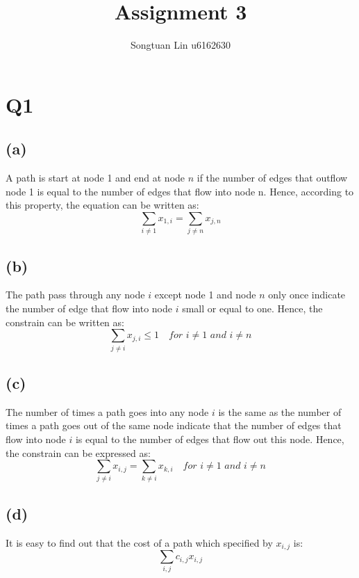 \documentclass[10pt,a4paper]{article}
\author{Songtuan Lin u6162630}
\title{Assignment 3}
\begin{document}
\maketitle

\section*{Q1}
\subsection*{(a)}
A path is start at node 1 and end at node $n$ if the number of edges that outflow node 1 is equal to the number of edges that flow into node n. Hence, according to this property, the equation can be written as:
\begin{equation}
	\displaystyle\sum_{i \neq 1} x_{1, i} = \displaystyle\sum_{j \neq n}x_{j, n}
	\label{1}
\end{equation}

\subsection*{(b)}
The path pass through any node $i$ except node 1 and node $n$ only once indicate the number of edge that flow into node $i$ small or equal to one. Hence, the constrain can be written as:
\begin{equation}
	\displaystyle\sum_{j \neq i}x_{j, i} \leq 1 \quad \textit{for } i \neq 1 \textit{ and } i \neq n
\end{equation}

\subsection*{(c)}
The number of times a path goes into any node $i$ is the same as the number of times a path goes out of the same node indicate that the number of edges that flow into node $i$ is equal to the number of edges that flow out this node. Hence, the constrain can be expressed as:
\begin{equation}
	\displaystyle\sum_{j \neq i}x_{i, j} = \displaystyle\sum_{k \neq i}x_{k, i} \quad \textit{for } i \neq 1 \textit{ and } i \neq n
\end{equation}

\subsection*{(d)}
It is easy to find out that the cost of a path which specified by $x_{i,j}$ is:
\begin{equation}
	\displaystyle\sum_{i, j} c_{i, j} x_{i, j}
	\label{4}
\end{equation}
\end{document}
